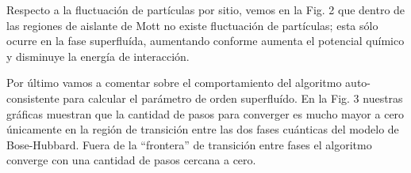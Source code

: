 \documentclass[11pt,letterpaper]{article}
\begin{document}
Respecto a la fluctuación de partículas por sitio, vemos en la Fig. 2 que
dentro de las regiones de aislante de Mott no existe fluctuación de partículas;
esta sólo ocurre en la fase superfluída, aumentando conforme aumenta el
potencial químico y disminuye la energía de interacción.

Por último vamos a comentar sobre el comportamiento del algoritmo auto-consistente
para calcular el parámetro de orden superfluído. En la Fig. 3 nuestras 
gráficas muestran que la cantidad de pasos para converger es mucho mayor 
a cero únicamente en la región de transición entre las dos fases cuánticas
del modelo de Bose-Hubbard. Fuera de la ``frontera'' de transición
entre fases el algoritmo converge con una cantidad de pasos cercana a cero.




\end{document}
